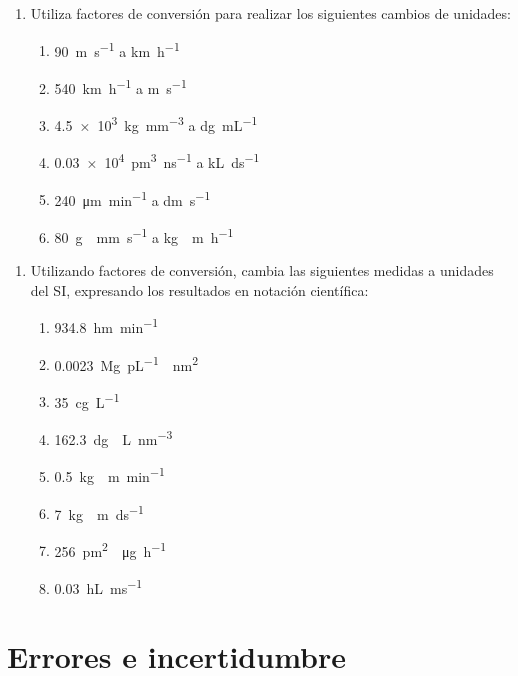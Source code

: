 \documentclass[
]{article}
\providecommand{\tightlist}{%
  \setlength{\itemsep}{0pt}\setlength{\parskip}{0pt}}
\begin{document}
\begin{enumerate}
\def\labelenumi{\arabic{enumi}.}
\setcounter{enumi}{4}
\tightlist
\item
  Utiliza factores de conversión para realizar los siguientes cambios de
  unidades:

  \begin{enumerate}
  \def\labelenumii{\alph{enumii})}
  \tightlist
  \item
    \SI{90}{\m\per\s} a \si{\km\per\hour}
  \item
    \SI{540}{\km\per\hour} a \si{\m\per\s}
  \item
    \SI{4.5e3}{\kg\per\cubic\mm} a \si{\deci\g\per\mL}
  \item
    \SI{0.03e4}{\cubic\pm\per\ns} a \si{\kilo\L\per\deci\s}
  \item
    \SI{240}{\um\per\minute} a \si{\dm\per\s}
  \item
    \SI{80}{\g\cdot\mm\per\s} a \si{\kg\cdot\m\per\hour}
  \end{enumerate}
\end{enumerate}

\begin{enumerate}
\def\labelenumi{\arabic{enumi}.}
\setcounter{enumi}{5}
\tightlist
\item
  Utilizando factores de conversión, cambia las siguientes medidas a
  unidades del SI, expresando los resultados en notación científica:

  \begin{enumerate}
  \def\labelenumii{\alph{enumii})}
  \tightlist
  \item
    \SI{934.8}{\hecto\m\per\minute}
  \item
    \SI{0.0023}{\mega\g\per\pico\L\cdot\square\nm}
  \item
    \SI{35}{\centi\g\per\L}
  \item
    \SI{162.3}{\deci\g\cdot\L\per\cubic\nm}
  \item
    \SI{0.5}{\kg\cdot\m\per\minute}
  \item
    \SI{7}{\kg\cdot\m\per\deci\s}
  \item
    \SI{256}{\square\pico\m\cdot\ug\per\hour}
  \item
    \SI{0.03}{\hL\per\ms}
  \end{enumerate}
\end{enumerate}

\hypertarget{errores-e-incertidumbre}{%
\section{Errores e incertidumbre}\label{errores-e-incertidumbre}}
\end{document}
